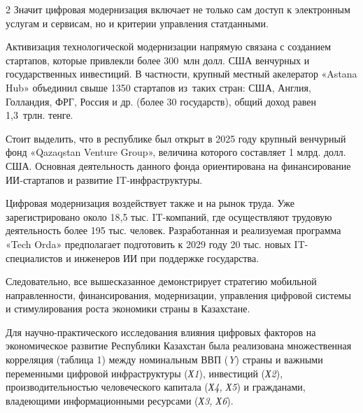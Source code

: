 \begin{multicols}{2}
Значит цифровая модернизация включает не только сам доступ к электронным
услугам и сервисам, но и критерии управления статданными.

Активизация технологической модернизации напрямую связана с созданием
стартапов, которые привлекли более 300~млн долл. США венчурных
и государственных инвестиций. В частности, крупный местный
акелератор «Astana Hub» объединил свыше 1350 стартапов из~таких стран:
США, Англия, Голландия, ФРГ, Россия и др. (более 30 государств), общий
доход равен 1,3~трлн. тенге.

Стоит выделить, что в республике был открыт в 2025 году крупный
венчурный фонд «Qazaqstan Venture Group», величина которого составляет 1
млрд. долл. США. Основная деятельность данного фонда ориентирована на
финансирование ИИ-стартапов и развитие IT-инфраструктуры.

Цифровая модернизация воздействует также и на рынок труда. Уже
зарегистрировано около 18,5 тыс. IT-компаний, где осуществляют трудовую
деятельность более 195 тыс. человек. Разработанная и реализуемая
программа «Tech Orda» предполагает подготовить к 2029 году 20 тыс. новых
IT-специалистов и инженеров ИИ при поддержке государства.

Следовательно, все вышесказанное демонстрирует стратегию мобильной
направленности, финансирования, модернизации, управления цифровой
системы и стимулирования роста экономики страны в Казахстане.

Для научно-практического исследования влияния цифровых факторов на
экономическое развитие Республики Казахстан была реализована
множественная корреляция (таблица 1) между номинальным ВВП (\emph{Y})
страны и важными переменными цифровой инфраструктуры (\emph{Х1}),
инвестиций (\emph{Х2}), производительностью человеческого капитала
(\emph{Х4, Х5}) и гражданами, владеющими информационными ресурсами
(\emph{Х3, Х6}).
\end{multicols}

